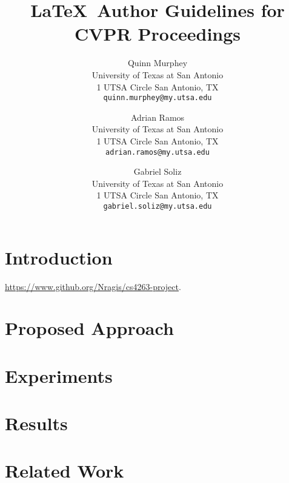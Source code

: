 \documentclass[final]{cvpr}
\begin{document}
\title{\LaTeX\ Author Guidelines for CVPR Proceedings}

\author{Quinn Murphey\\
University of Texas at San Antonio\\
1 UTSA Circle San Antonio, TX\\
{\tt\small quinn.murphey@my.utsa.edu}
\and
Adrian Ramos\\
University of Texas at San Antonio\\
1 UTSA Circle San Antonio, TX\\
{\tt\small adrian.ramos@my.utsa.edu}

\and
Gabriel Soliz\\
University of Texas at San Antonio\\
1 UTSA Circle San Antonio, TX\\
{\tt\small gabriel.soliz@my.utsa.edu}
}

\maketitle


\begin{abstract}
\end{abstract}


\section{Introduction}

\url{https://www.github.org/Nragis/cs4263-project}.


\section{Proposed Approach}

\section{Experiments}

\section{Results}

\section{Related Work}

{\small


}
\end{document}
